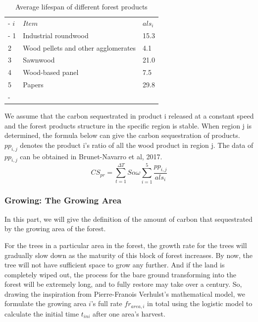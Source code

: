 \begin{table}[h]
	\centering
	\caption{Average lifespan of different forest products \cite{article}}
	\tabulinesep=1mm
	\begin{tabu}to \linewidth{X[c,m]X[2.5,c,m]X[c,m]}
		\tabucline[0.08em]-
		$i$ & $Item$                                  & $als_i$  \\ \tabucline[0.08em]-
		1	& Industrial roundwood                    & 15.3     \\
		2	& Wood pellets and other agglomerates     & 4.1	     \\
		3	& Sawnwood                                & 21.0	 \\
		4	& Wood-based panel                        & 7.5	     \\
		5	& Papers                                  & 29.8     \\
		\tabucline[0.08em]-
	\end{tabu}
    \label{table3}
\end{table}

We assume that the carbon sequestrated in product i released at a constant speed and the forest products structure in the specific region is stable. When region j is determined, the formula below can give the carbon sequestration of products. $pp_{i,j}$ denotes the product i's ratio of all the wood product in region j. The data of $pp_{i,j}$ can be obtained in Brunet-Navarro et al, 2017\cite{article}.
\begin{equation}
CS_{pr} = \sum_{t=1}^{\Delta T}S\alpha\omega\sum\limits _{i=1}^{5} \frac{pp_{i,j}}{als_i}
\end{equation}


\subsubsection{Growing: The Growing Area}
In this part, we will give the definition of the amount of carbon that sequestrated by the growing area of the forest.

For the trees in a particular area in the forest, the growth rate for the trees will gradually slow down as the maturity of this block of forest increases. By now, the tree will not have sufficient space to grow any further. 
And if the land is completely wiped out, the process for the bare ground transforming into the forest will be extremely long, and to fully restore may take over a century\cite{1}. 
So, drawing the inspiration from  Pierre-Franois Verhulst's mathematical model, we formulate the growing area $i$'s full rate $fr_{area,i}$ in total using the logistic model to calculate the initial time $t_{ini}$ after one area's harvest.

